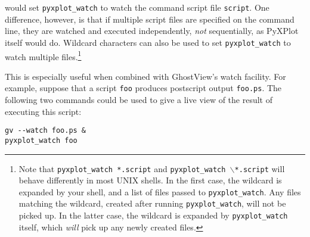 \noindent would set \texttt{pyxplot\_watch} to watch the command script file
\texttt{script}. One difference, however, is that if multiple script files are
specified on the command line, they are watched and executed independently,
\textit{not} sequentially, as PyXPlot itself would do. Wildcard characters can
also be used to set \texttt{pyxplot\_watch} to watch multiple
files.\footnote{Note that \texttt{pyxplot\_watch *.script} and
\texttt{pyxplot\_watch $\backslash$*.script} will behave differently in most
UNIX shells.  In the first case, the wildcard is expanded by your shell, and a
list of files passed to \texttt{pyxplot\_watch}. Any files matching the
wildcard, created after running \texttt{pyxplot\_watch}, will not be picked up.
In the latter case, the wildcard is expanded by \texttt{pyxplot\_watch} itself,
which \textit{will} pick up any newly created files.}

This is especially useful when combined with GhostView's watch facility. For
example, suppose that a script \texttt{foo} produces postscript output
\texttt{foo.ps}. The following two commands could be used to give a live view
of the result of executing this script:

\begin{verbatim}
gv --watch foo.ps &
pyxplot_watch foo
\end{verbatim}
